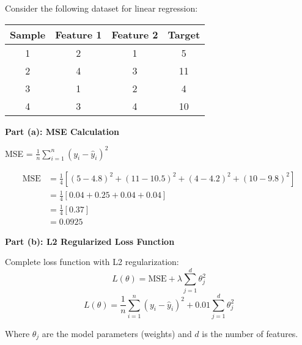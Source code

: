 \documentclass{../../common/quals-template}
\begin{document}
\begin{questions}
Consider the following dataset for linear regression:

\begin{center}
\begin{tabular}{|c|c|c|c|}
\hline
\textbf{Sample} & \textbf{Feature 1} & \textbf{Feature 2} & \textbf{Target} \\
\hline
1 & 2 & 1 & 5 \\
\hline
2 & 4 & 3 & 11 \\
\hline
3 & 1 & 2 & 4 \\
\hline
4 & 3 & 4 & 10 \\
\hline
\end{tabular}
\end{center}


\begin{solution}
\textbf{Part (a): MSE Calculation}

MSE = $\frac{1}{n}\sum_{i=1}^{n}(y_i - \hat{y}_i)^2$

\begin{align}
\text{MSE} &= \frac{1}{4}[(5-4.8)^2 + (11-10.5)^2 + (4-4.2)^2 + (10-9.8)^2]\\
&= \frac{1}{4}[0.04 + 0.25 + 0.04 + 0.04]\\
&= \frac{1}{4}[0.37]\\
&= 0.0925
\end{align}

\textbf{Part (b): L2 Regularized Loss Function}

Complete loss function with L2 regularization:
$$L(\theta) = \text{MSE} + \lambda \sum_{j=1}^{d} \theta_j^2$$
$$L(\theta) = \frac{1}{n}\sum_{i=1}^{n}(y_i - \hat{y}_i)^2 + 0.01 \sum_{j=1}^{d} \theta_j^2$$

Where $\theta_j$ are the model parameters (weights) and $d$ is the number of features.
\end{solution}


\end{questions}
\end{document}

